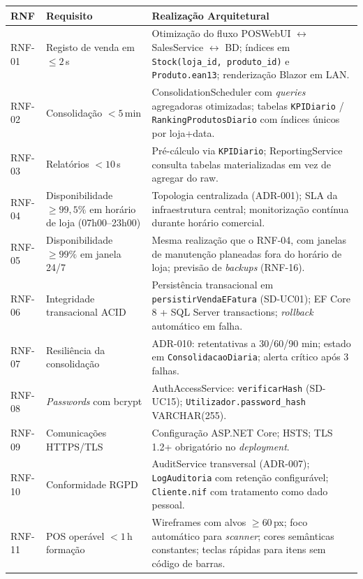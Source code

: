 \begin{table}[H]
\centering\small
\renewcommand{\arraystretch}{1.25}
\begin{tabular}{|p{1.5cm}|p{4.5cm}|p{8cm}|}
\hline
\textbf{RNF} & \textbf{Requisito} & \textbf{Realização Arquitetural} \\
\hline
RNF-01 & Registo de venda em $\leq 2$\,s & Otimização do fluxo POSWebUI $\leftrightarrow$ SalesService $\leftrightarrow$ BD; índices em \texttt{Stock(loja\_id, produto\_id)} e \texttt{Produto.ean13}; renderização Blazor em LAN. \\
\hline
RNF-02 & Consolidação $< 5$\,min & ConsolidationScheduler com \textit{queries} agregadoras otimizadas; tabelas \texttt{KPIDiario} / \texttt{RankingProdutosDiario} com índices únicos por loja+data. \\
\hline
RNF-03 & Relatórios $< 10$\,s & Pré-cálculo via \texttt{KPIDiario}; ReportingService consulta tabelas materializadas em vez de agregar do raw. \\
\hline
RNF-04 & Disponibilidade $\geq 99{,}5\%$ em horário de loja (07h00--23h00) & Topologia centralizada (ADR-001); SLA da infraestrutura central; monitorização contínua durante horário comercial. \\
\hline
RNF-05 & Disponibilidade $\geq 99\%$ em janela 24/7 & Mesma realização que o RNF-04, com janelas de manutenção planeadas fora do horário de loja; previsão de \textit{backups} (RNF-16). \\
\hline
RNF-06 & Integridade transacional ACID & Persistência transacional em \texttt{persistirVendaEFatura} (SD-UC01); EF Core 8 + SQL Server transactions; \textit{rollback} automático em falha. \\
\hline
RNF-07 & Resiliência da consolidação & ADR-010: retentativas a 30/60/90 min; estado em \texttt{ConsolidacaoDiaria}; alerta crítico após 3 falhas. \\
\hline
RNF-08 & \textit{Passwords} com bcrypt & AuthAccessService: \texttt{verificarHash} (SD-UC15); \texttt{Utilizador.password\_hash} VARCHAR(255). \\
\hline
RNF-09 & Comunicações HTTPS/TLS & Configuração ASP.NET Core; HSTS; TLS 1.2+ obrigatório no \textit{deployment}. \\
\hline
RNF-10 & Conformidade RGPD & AuditService transversal (ADR-007); \texttt{LogAuditoria} com retenção configurável; \texttt{Cliente.nif} com tratamento como dado pessoal. \\
\hline
RNF-11 & POS operável $< 1$\,h formação & Wireframes com alvos $\geq 60$\,px; foco automático para \textit{scanner}; cores semânticas constantes; teclas rápidas para itens sem código de barras. \\

\end{tabular}
\end{table}
